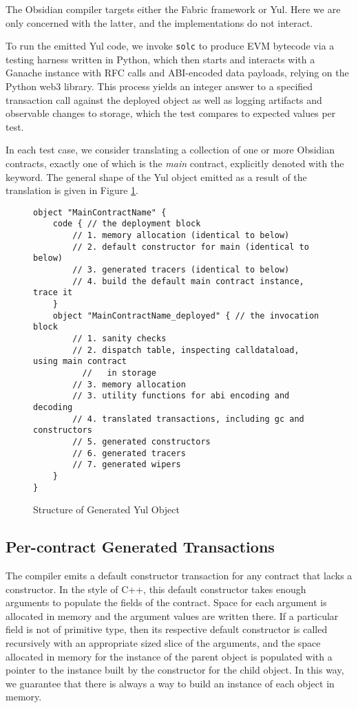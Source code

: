 The Obsidian compiler targets either the Fabric framework or Yul. Here we
are only concerned with the latter, and the implementations do not
interact.

To run the emitted Yul code, we invoke \texttt{solc} to produce EVM
bytecode via a testing harness written in Python, which then starts and
interacts with a Ganache instance with RFC calls and ABI-encoded data
payloads, relying on the Python web3 library. This process yields an
integer answer to a specified transaction call against the deployed object
as well as logging artifacts and observable changes to storage, which the
test compares to expected values per test.

In each test case, we consider translating a collection of one or more
Obsidian contracts, exactly one of which is the \emph{main} contract,
explicitly denoted with the  keyword. The general shape of the
Yul object emitted as a result of the translation is given in
Figure \ref{code.1}.

\begin{figure}[hbtp]
    \caption{Structure of Generated Yul Object}
    \label{code.1}
    \begin{lstlisting}[language=yul,frame=single]
object "MainContractName" {
    code { // the deployment block
        // 1. memory allocation (identical to below)
        // 2. default constructor for main (identical to below)
        // 3. generated tracers (identical to below)
        // 4. build the default main contract instance, trace it
    }
    object "MainContractName_deployed" { // the invocation block
        // 1. sanity checks
        // 2. dispatch table, inspecting calldataload, using main contract
          //   in storage
        // 3. memory allocation
        // 3. utility functions for abi encoding and decoding
        // 4. translated transactions, including gc and constructors
        // 5. generated constructors
        // 6. generated tracers
        // 7. generated wipers
    }
}
    \end{lstlisting}
\end{figure}

\subsection{Per-contract Generated Transactions}

The compiler emits a default constructor transaction for any contract that
lacks a constructor. In the style of C++, this default constructor takes
enough arguments to populate the fields of the contract. \cite{TODO} Space
for each argument is allocated in memory and the argument values are
written there. If a particular field is not of primitive type, then its
respective default constructor is called recursively with an appropriate
sized slice of the arguments, and the space allocated in memory for the
instance of the parent object is populated with a pointer to the instance
built by the constructor for the child object. In this way, we guarantee
that there is always a way to build an instance of each object in memory.

